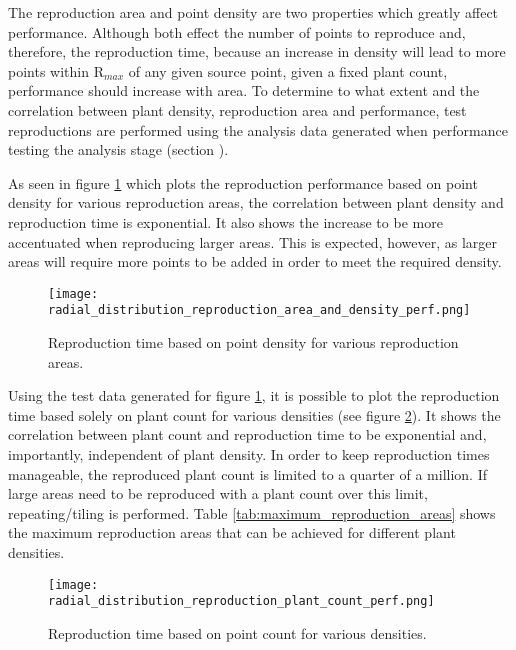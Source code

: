 {The reproduction area and point density are two properties which greatly affect performance. Although both effect the number of points to reproduce and, therefore, the reproduction time, because an increase in density will lead to more points within R$_{max}$ of any given source point, given a fixed plant count, performance should increase with area. To determine to what extent and the correlation between plant density, reproduction area and performance, test reproductions are performed using the analysis data generated when performance testing the analysis stage (section \label{subsubsec:analysis_performance}).

As seen in figure \ref{fig:reproduction_density_area_perf} which plots the reproduction performance based on point density for various reproduction areas, the correlation between plant density and reproduction time is exponential. It also shows the increase to be more accentuated when reproducing larger areas. This is expected, however, as larger areas will require more points to be added in order to meet the required density.\\

\begin{figure}
\center
	\texttt{[image: radial\_distribution\_reproduction\_area\_and\_density\_perf.png]}
	\caption{ Reproduction time based on point density for various reproduction areas.}	
	\label{fig:reproduction_density_area_perf}
\end{figure}

Using the test data generated for figure \ref{fig:reproduction_density_area_perf}, it is possible to plot the reproduction time based solely on plant count for various densities (see figure \ref{fig:reproduction_plant_count_perf}). It shows the correlation between plant count and reproduction time to be exponential and, importantly, independent of plant density. In order to keep reproduction times manageable, the reproduced plant count is limited to a quarter of a million. If large areas need to be reproduced with a plant count over this limit, repeating/tiling is performed. Table \ref{tab:maximum_reproduction_areas} shows the maximum reproduction areas that can be achieved for different plant densities.

\begin{figure}
\center
	\texttt{[image: radial\_distribution\_reproduction\_plant\_count\_perf.png]}
	\caption{ Reproduction time based on point count for various densities.}	
	\label{fig:reproduction_plant_count_perf}
\end{figure}

}
